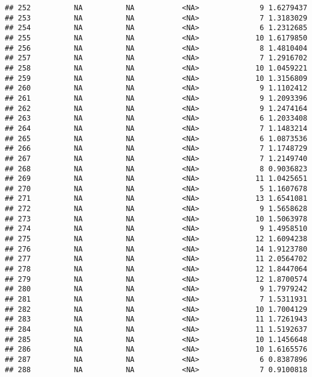 \documentclass[]{article}
\begin{document}
\begin{verbatim}
## 252          NA          NA           <NA>              9 1.6279437
## 253          NA          NA           <NA>              7 1.3183029
## 254          NA          NA           <NA>              6 1.2312685
## 255          NA          NA           <NA>             10 1.6179850
## 256          NA          NA           <NA>              8 1.4810404
## 257          NA          NA           <NA>              7 1.2916702
## 258          NA          NA           <NA>             10 1.0459221
## 259          NA          NA           <NA>             10 1.3156809
## 260          NA          NA           <NA>              9 1.1102412
## 261          NA          NA           <NA>              9 1.2093396
## 262          NA          NA           <NA>              9 1.2474164
## 263          NA          NA           <NA>              6 1.2033408
## 264          NA          NA           <NA>              7 1.1483214
## 265          NA          NA           <NA>              6 1.0873536
## 266          NA          NA           <NA>              7 1.1748729
## 267          NA          NA           <NA>              7 1.2149740
## 268          NA          NA           <NA>              8 0.9036823
## 269          NA          NA           <NA>             11 1.0425651
## 270          NA          NA           <NA>              5 1.1607678
## 271          NA          NA           <NA>             13 1.6541081
## 272          NA          NA           <NA>              9 1.5658628
## 273          NA          NA           <NA>             10 1.5063978
## 274          NA          NA           <NA>              9 1.4958510
## 275          NA          NA           <NA>             12 1.6094238
## 276          NA          NA           <NA>             14 1.9123780
## 277          NA          NA           <NA>             11 2.0564702
## 278          NA          NA           <NA>             12 1.8447064
## 279          NA          NA           <NA>             12 1.8700574
## 280          NA          NA           <NA>              9 1.7979242
## 281          NA          NA           <NA>              7 1.5311931
## 282          NA          NA           <NA>             10 1.7004129
## 283          NA          NA           <NA>             11 1.7261943
## 284          NA          NA           <NA>             11 1.5192637
## 285          NA          NA           <NA>             10 1.1456648
## 286          NA          NA           <NA>             10 1.6165576
## 287          NA          NA           <NA>              6 0.8387896
## 288          NA          NA           <NA>              7 0.9100818

\end{verbatim}
\end{document}
